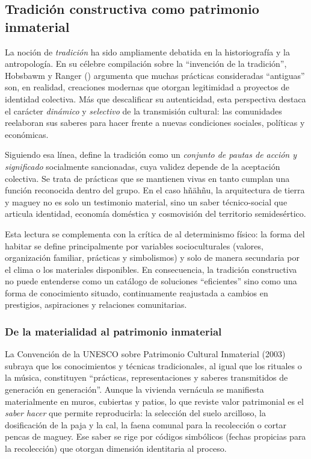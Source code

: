 \subsection{Tradición constructiva como patrimonio inmaterial}
\label{subsec:tradicion_constructiva}

La noción de \emph{tradición} ha sido ampliamente debatida en la
historiografía y la antropología.  En su célebre compilación sobre la
\enquote{invención de la tradición}, Hobsbawm y Ranger (\citeyear{hobsbawm1983inventar})
argumenta que muchas prácticas consideradas “antiguas” son, en realidad,
creaciones modernas que otorgan legitimidad a proyectos de identidad
colectiva.  Más que descalificar su autenticidad, esta perspectiva
destaca el carácter \emph{dinámico} y \emph{selectivo} de la
transmisión cultural: las comunidades reelaboran sus saberes para hacer
frente a nuevas condiciones sociales, políticas y económicas.

Siguiendo esa línea, \citeauthor{herrejon1994} define la tradición como
un \emph{conjunto de pautas de acción y significado}
socialmente sancionadas, cuya validez depende de la aceptación
colectiva.\citep{herrejon1994}  Se trata de prácticas que se
mantienen vivas en tanto cumplan una función reconocida dentro del
grupo.  En el caso hñähñu, la arquitectura de tierra y maguey no es
solo un testimonio material, sino un saber técnico-social que articula
identidad, economía doméstica y cosmovisión del territorio
semidesértico.

Esta lectura se complementa con la crítica de \citeauthor{rapoport1969} al
determinismo físico: la forma del habitar se define principalmente por
variables socioculturales (valores, organización familiar, prácticas y
simbolismos) y solo de manera secundaria por el clima o los materiales
disponibles.\citep{rapoport1969}  En consecuencia, la tradición
constructiva no puede entenderse como un catálogo de soluciones
\enquote{eficientes} sino como una forma de conocimiento situado,
continuamente reajustada a cambios en prestigios, aspiraciones y
relaciones comunitarias.

\subsubsection{De la materialidad al patrimonio inmaterial}

La Convención de la UNESCO sobre Patrimonio Cultural Inmaterial (2003)
subraya que los conocimientos y técnicas
tradicionales, al igual que los rituales o la música, constituyen
``prácticas, representaciones y saberes transmitidos de
generación en generación''.  Aunque la vivienda vernácula se manifiesta
materialmente en muros, cubiertas y patios, lo que reviste valor
patrimonial es el \emph{saber hacer} que permite reproducirla: la
selección del suelo arcilloso, la dosificación de la paja y la cal, la
faena comunal para la recolección o cortar pencas de maguey. Ese saber
se rige por códigos simbólicos (fechas propicias
para la recolección) que otorgan dimensión identitaria al proceso.

